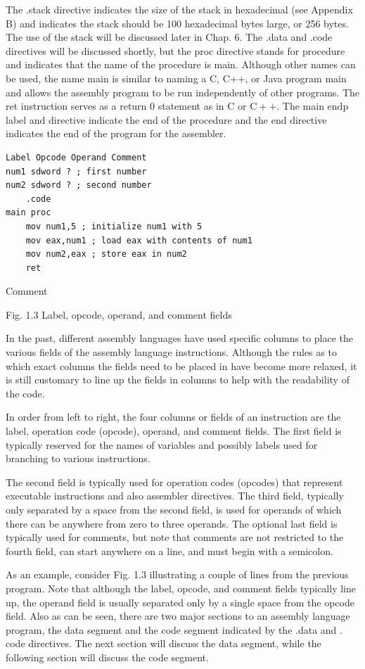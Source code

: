 \documentclass[10pt]{book}
\begin{document}
The .stack directive indicates the size of the stack in hexadecimal (see Appendix B) and indicates the stack should be 100 hexadecimal bytes large, or 256 bytes. The use of the stack will be discussed later in Chap. 6. The .data and .code directives will be discussed shortly, but the proc directive stands for procedure and indicates that the name of the procedure is main. Although other names can be used, the name main is similar to naming a C, C++, or Java program main and allows the assembly program to be run independently of other programs. The ret instruction serves as a return 0 statement as in C or $\mathrm{C}++$. The main endp label and directive indicate the end of the procedure and the end directive indicates the end of the program for the assembler.

\begin{verbatim}
Label Opcode Operand Comment
num1 sdword ? ; first number
num2 sdword ? ; second number
    .code
main proc
    mov num1,5 ; initialize num1 with 5
    mov eax,num1 ; load eax with contents of num1
    mov num2,eax ; store eax in num2
    ret
\end{verbatim}

Comment

Fig. 1.3 Label, opcode, operand, and comment fields

In the past, different assembly languages have used specific columns to place the various fields of the assembly language instructions. Although the rules as to which exact columns the fields need to be placed in have become more relaxed, it is still customary to line up the fields in columns to help with the readability of the code.

In order from left to right, the four columns or fields of an instruction are the label, operation code (opcode), operand, and comment fields. The first field is typically reserved for the names of variables and possibly labels used for branching to various instructions.

The second field is typically used for operation codes (opcodes) that represent executable instructions and also assembler directives. The third field, typically only separated by a space from the second field, is used for operands of which there can be anywhere from zero to three operands. The optional last field is typically used for comments, but note that comments are not restricted to the fourth field, can start anywhere on a line, and must begin with a semicolon.

As an example, consider Fig. 1.3 illustrating a couple of lines from the previous program. Note that although the label, opcode, and comment fields typically line up, the operand field is usually separated only by a single space from the opcode field. Also as can be seen, there are two major sections to an assembly language program, the data segment and the code segment indicated by the .data and . code directives. The next section will discuss the data segment, while the following section will discuss the code segment.
\end{document}
